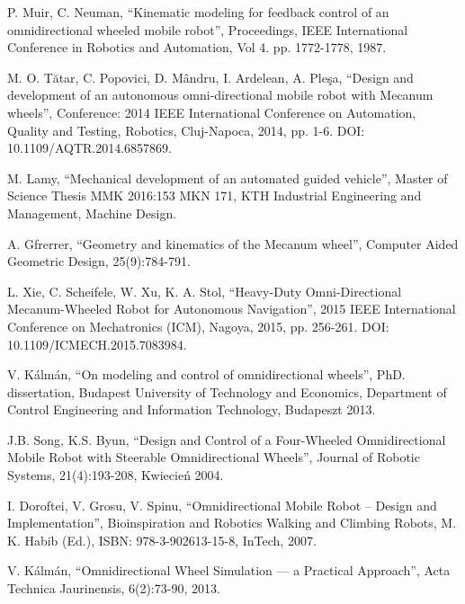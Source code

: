   \begin{thebibliography}{0}

P. Muir, C. Neuman,
``Kinematic modeling for feedback control of an omnidirectional wheeled mobile robot'', 
Proceedings, IEEE International Conference in Robotics and Automation, 
Vol 4. pp. 1772-1778, 1987.

M. O. Tătar, C. Popovici, D. Mândru, I. Ardelean, A. Pleşa,
``Design and development of an autonomous omni-directional mobile robot with Mecanum wheels'',
Conference: 2014 IEEE International Conference on Automation, Quality and Testing, Robotics,
Cluj-Napoca, 2014, pp. 1-6. DOI: 10.1109/AQTR.2014.6857869.

M. Lamy, 
``Mechanical development of an automated guided vehicle'',
Master of Science Thesis MMK 2016:153 MKN 171,
KTH Industrial Engineering and Management,
Machine Design.

A. Gfrerrer, 
``Geometry and kinematics of the Mecanum wheel'',
Computer Aided Geometric Design,
25(9):784-791.

L. Xie, C. Scheifele, W. Xu, K. A. Stol, 
``Heavy-Duty Omni-Directional Mecanum-Wheeled Robot for Autonomous Navigation'',
2015 IEEE International Conference on Mechatronics (ICM), Nagoya, 2015, pp. 256-261.
DOI: 10.1109/ICMECH.2015.7083984.

V. Kálmán, 
``On modeling and control of omnidirectional wheels'',
PhD. dissertation, Budapest University of Technology and Economics,
Department of Control Engineering and Information Technology,
Budapeszt 2013.

J.B. Song, K.S. Byun,
``Design and Control of a Four-Wheeled Omnidirectional Mobile Robot with Steerable Omnidirectional Wheels'',
Journal of Robotic Systems,
21(4):193-208, 
Kwiecień 2004.

I. Doroftei, V. Grosu, V. Spinu,
``Omnidirectional Mobile Robot – Design and Implementation'',
Bioinspiration and Robotics Walking and Climbing Robots, M. K. Habib (Ed.), 
ISBN: 978-3-902613-15-8, InTech,
2007.

V. Kálmán,
``Omnidirectional Wheel Simulation --- a Practical Approach'',
Acta Technica Jaurinensis,
6(2):73-90,
2013.


\end{thebibliography}
